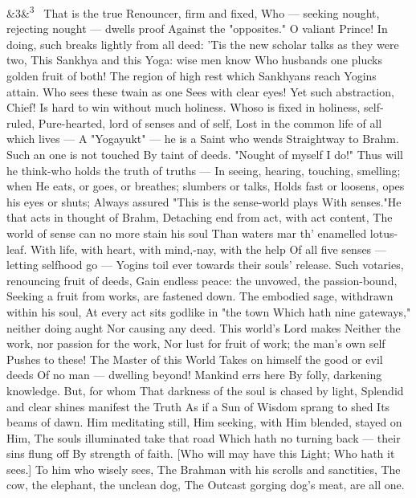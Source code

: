 \documentclass[12pt]{article}
\newcommand{\para}[1][]{\par\noindent\ifx&#1&\else\textsuperscript{\footnotesize #1}~\fi}
\begin{document}
\para[3] That is the true Renouncer, firm and fixed, Who --- seeking nought, rejecting nought --- dwells proof Against the "opposites." O valiant Prince! In doing, such breaks lightly from all deed: 'Tis the new scholar talks as they were two, This Sankhya and this Yoga: wise men know Who husbands one plucks golden fruit of both! The region of high rest which Sankhyans reach Yogins attain. Who sees these twain as one Sees with clear eyes! Yet such abstraction, Chief! Is hard to win without much holiness. Whoso is fixed in holiness, self-ruled, Pure-hearted, lord of senses and of self, Lost in the common life of all which lives --- A "Yogayukt" --- he is a Saint who wends Straightway to Brahm. Such an one is not touched By taint of deeds. "Nought of myself I do!" Thus will he think-who holds the truth of truths --- In seeing, hearing, touching, smelling; when He eats, or goes, or breathes; slumbers or talks, Holds fast or loosens, opes his eyes or shuts; Always assured "This is the sense-world plays With senses."He that acts in thought of Brahm, Detaching end from act, with act content, The world of sense can no more stain his soul Than waters mar th' enamelled lotus-leaf. With life, with heart, with mind,-nay, with the help Of all five senses --- letting selfhood go --- Yogins toil ever towards their souls' release. Such votaries, renouncing fruit of deeds, Gain endless peace: the unvowed, the passion-bound, Seeking a fruit from works, are fastened down. The embodied sage, withdrawn within his soul, At every act sits godlike in "the town Which hath nine gateways," neither doing aught Nor causing any deed. This world's Lord makes Neither the work, nor passion for the work, Nor lust for fruit of work; the man's own self Pushes to these! The Master of this World Takes on himself the good or evil deeds Of no man --- dwelling beyond! Mankind errs here By folly, darkening knowledge. But, for whom That darkness of the soul is chased by light, Splendid and clear shines manifest the Truth As if a Sun of Wisdom sprang to shed Its beams of dawn. Him meditating still, Him seeking, with Him blended, stayed on Him, The souls illuminated take that road Which hath no turning back --- their sins flung off By strength of faith. [Who will may have this Light; Who hath it sees.] To him who wisely sees, The Brahman with his scrolls and sanctities, The cow, the elephant, the unclean dog, The Outcast gorging dog's meat, are all one.
\end{document}
